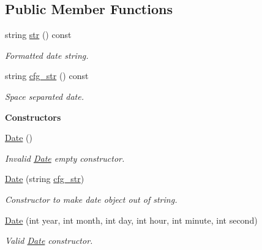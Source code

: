 \subsection*{Public Member Functions}
\begin{DoxyCompactItemize}
\item 
string \hyperlink{class_date_a13151b0c602df2d15d069aa810ba545a}{str} () const 
\begin{DoxyCompactList}\small\item\em Formatted date string. \end{DoxyCompactList}\item 
string \hyperlink{class_date_a45c077b993feb35975d12c5c32848b5b}{cfg\+\_\+str} () const 
\begin{DoxyCompactList}\small\item\em Space separated date. \end{DoxyCompactList}\end{DoxyCompactItemize}
\begin{Indent}{\bf Constructors}\par
\begin{DoxyCompactItemize}
\item 
\hyperlink{class_date_a4e59ed4ba66eec61c27460c5d09fa1bd}{Date} ()
\begin{DoxyCompactList}\small\item\em Invalid \hyperlink{class_date}{Date} empty constructor. \end{DoxyCompactList}\item 
\hyperlink{class_date_a32f8887c45cf92c7ca14458b0f7dc417}{Date} (string \hyperlink{class_date_a45c077b993feb35975d12c5c32848b5b}{cfg\+\_\+str})
\begin{DoxyCompactList}\small\item\em Constructor to make date object out of string. \end{DoxyCompactList}\item 
\hyperlink{class_date_a294e64b7015eae07a7c15147822520ab}{Date} (int year, int month, int day, int hour, int minute, int second)
\begin{DoxyCompactList}\small\item\em Valid \hyperlink{class_date}{Date} constructor. \end{DoxyCompactList}\end{DoxyCompactItemize}
\end{Indent}
